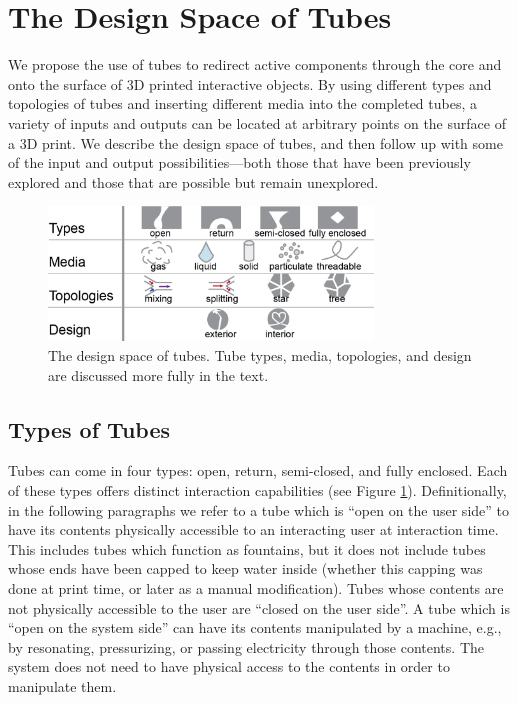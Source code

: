 \section{The Design Space of Tubes}

We propose the use of tubes to redirect active components through the core and onto the surface of 3D printed interactive objects.  By using different types and topologies of tubes and inserting different media into the completed tubes, a variety of inputs and outputs can be located at arbitrary points on the surface of a 3D print.  We describe the design space of tubes, and then follow up with some of the input and output possibilities---both those that have been previously explored and those that are possible but remain unexplored.

\begin{figure}[h]
\centering
    \includegraphics[width=3.4in]{figures/tubespace.png}
\caption{The design space of tubes.  Tube types, media, topologies, and design are discussed more fully in the text.}
\label{fig:tubespace}
\end{figure}

\subsection{Types of Tubes}

Tubes can come in four types: open, return, semi-closed, and fully enclosed.  Each of these types offers distinct interaction capabilities (see Figure \ref{fig:tubespace}).  Definitionally, in the following paragraphs we refer to a tube which is ``open on the user side'' to have its contents physically accessible to an interacting user at interaction time.  This includes tubes which function as fountains, but it does not include tubes whose ends have been capped to keep water inside (whether this capping was done at print time, or later as a manual modification).  Tubes whose contents are not physically accessible to the user are ``closed on the user side''.  A tube which is ``open on the system side'' can have its contents manipulated by a machine, e.g., by resonating, pressurizing, or passing electricity through those contents.  The system does not need to have physical access to the contents in order to manipulate them.

